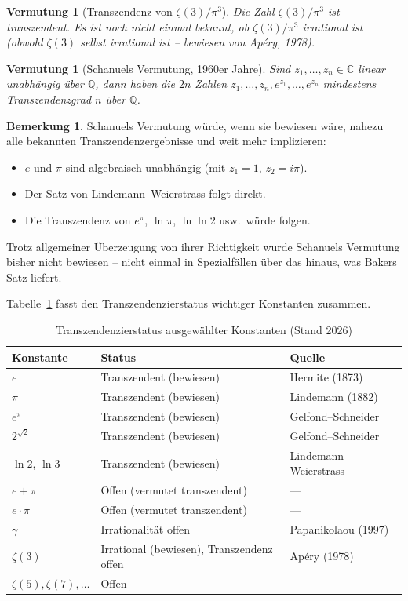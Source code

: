 \documentclass[12pt,a4paper]{amsart}
\newtheorem{conjecture}[theorem]{Vermutung}
\theoremstyle{definition}
\newtheorem{bemerkung}[theorem]{Bemerkung}
\begin{document}
\begin{conjecture}[Transzendenz von $\zeta(3)/\pi^3$]
\label{verm:zeta3}
Die Zahl $\zeta(3)/\pi^3$ ist transzendent. Es ist noch nicht einmal bekannt,
ob $\zeta(3)/\pi^3$ irrational ist (obwohl $\zeta(3)$ selbst irrational ist --
bewiesen von Apéry, 1978).
\end{conjecture}

\begin{conjecture}[Schanuels Vermutung, 1960er Jahre]
\label{verm:schanuel}
Sind $z_1, \ldots, z_n \in \mathbb{C}$ linear unabhängig über $\mathbb{Q}$,
dann haben die $2n$ Zahlen $z_1, \ldots, z_n, e^{z_1}, \ldots, e^{z_n}$
mindestens Transzendenzgrad $n$ über $\mathbb{Q}$.
\end{conjecture}

\begin{bemerkung}
Schanuels Vermutung würde, wenn sie bewiesen wäre, nahezu alle bekannten
Transzendenzergebnisse und weit mehr implizieren:
\begin{itemize}[leftmargin=2em]
  \item $e$ und $\pi$ sind algebraisch unabhängig (mit $z_1 = 1$, $z_2 = i\pi$).
  \item Der Satz von Lindemann--Weierstrass folgt direkt.
  \item Die Transzendenz von $e^\pi$, $\ln\pi$, $\ln\ln 2$ usw.\ würde folgen.
\end{itemize}
Trotz allgemeiner Überzeugung von ihrer Richtigkeit wurde Schanuels Vermutung
bisher nicht bewiesen -- nicht einmal in Spezialfällen über das hinaus, was
Bakers Satz liefert.
\end{bemerkung}

Tabelle~\ref{tab:status} fasst den Transzendenzierstatus wichtiger Konstanten
zusammen.

\begin{table}[ht]
\centering
\caption{Transzendenzierstatus ausgewählter Konstanten (Stand 2026)}
\label{tab:status}
\begin{tabular}{lll}
\toprule
Konstante & Status & Quelle \\
\midrule
$e$ & Transzendent (bewiesen) & Hermite (1873) \\
$\pi$ & Transzendent (bewiesen) & Lindemann (1882) \\
$e^\pi$ & Transzendent (bewiesen) & Gelfond--Schneider \\
$2^{\sqrt{2}}$ & Transzendent (bewiesen) & Gelfond--Schneider \\
$\ln 2$, $\ln 3$ & Transzendent (bewiesen) & Lindemann--Weierstrass \\
$e + \pi$ & Offen (vermutet transzendent) & --- \\
$e \cdot \pi$ & Offen (vermutet transzendent) & --- \\
$\gamma$ & Irrationalität offen & Papanikolaou (1997) \\
$\zeta(3)$ & Irrational (bewiesen), Transzendenz offen & Apéry (1978) \\
$\zeta(5), \zeta(7), \ldots$ & Offen & --- \\
\bottomrule
\end{tabular}
\end{table}
\end{document}
